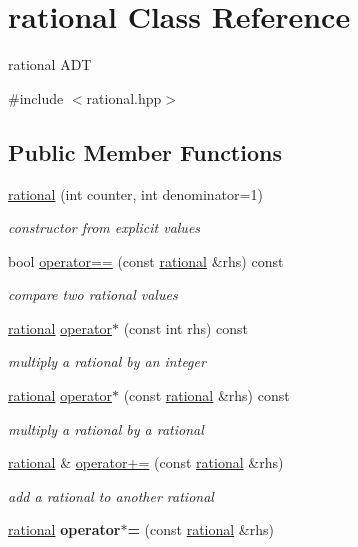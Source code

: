 \hypertarget{classrational}{}\section{rational Class Reference}
\label{classrational}


rational A\+DT  




{\ttfamily \#include $<$rational.\+hpp$>$}

\subsection*{Public Member Functions}
\begin{DoxyCompactItemize}
\item 
\hyperlink{classrational_a5f971ef33181044f54d8e4fee71cb957}{rational} (int counter, int denominator=1)
\begin{DoxyCompactList}\small\item\em constructor from explicit values \end{DoxyCompactList}\item 
bool \hyperlink{classrational_a8b565720ea15ddfb17ea202e27698478}{operator==} (const \hyperlink{classrational}{rational} \&rhs) const
\begin{DoxyCompactList}\small\item\em compare two rational values \end{DoxyCompactList}\item 
\hyperlink{classrational}{rational} \hyperlink{classrational_a9c0f08f8be5db907dc6d93ad3f5cb26b}{operator$\ast$} (const int rhs) const
\begin{DoxyCompactList}\small\item\em multiply a rational by an integer \end{DoxyCompactList}\item 
\hyperlink{classrational}{rational} \hyperlink{classrational_a1dd39ab2daf08ee68087fdbb37be258e}{operator$\ast$} (const \hyperlink{classrational}{rational} \&rhs) const
\begin{DoxyCompactList}\small\item\em multiply a rational by a rational \end{DoxyCompactList}\item 
\hyperlink{classrational}{rational} \& \hyperlink{classrational_a9b83ad0c803d2ac242b42e71d954a356}{operator+=} (const \hyperlink{classrational}{rational} \&rhs)
\begin{DoxyCompactList}\small\item\em add a rational to another rational \end{DoxyCompactList}\item 
\mbox{\label{classrational_a2b5729aef261d16cd18ff7c7fcbf8c6e}} 
\hyperlink{classrational}{rational} {\bfseries operator$\ast$=} (const \hyperlink{classrational}{rational} \&rhs)
\end{DoxyCompactItemize}
